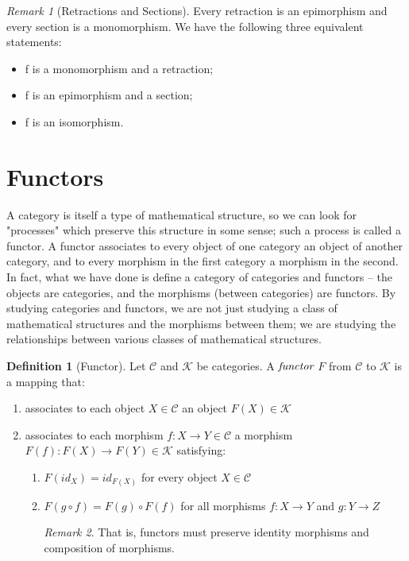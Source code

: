 \documentclass[10pt, oneside, reqno]{amsart}
\theoremstyle{plain}%
\theoremstyle{definition}
\newtheorem{defn}[thm]{Definition}
\theoremstyle{remark}
\newtheorem*{rem}{Remark}
\begin{document}
\begin{rem}[Retractions and Sections]
Every retraction is an epimorphism and every section is a monomorphism.
We have the following three equivalent statements:
\begin{itemize}
\item f is a monomorphism and a retraction;
\item f is an epimorphism and a section;
\item f is an isomorphism.
\end{itemize}
\end{rem}

\section{Functors} %
\label{sec:functors}
A category is itself a type of mathematical structure, so we can look for "processes" which preserve this structure in some sense; such a process is called a functor.
A functor associates to every object of one category an object of another category, and to every morphism in the first category a morphism in the second.
In fact, what we have done is define a category of categories and functors – the objects are categories, and the morphisms (between categories) are functors.
By studying categories and functors, we are not just studying a class of mathematical structures and the morphisms between them;
we are studying the relationships between various classes of mathematical structures.

\begin{defn}[Functor]
	Let $\mathcal{C}$ and $\mathcal{K}$ be categories. A $\emph{functor}$ $F$ from $\mathcal{C}$ to $\mathcal{K}$ is a mapping that:
	\begin{enumerate}
		\item associates to each object $X \in \mathcal{C}$ an object $F(X) \in  \mathcal{K}$
		
		\item associates to each morphism $f : X \to Y \in \mathcal{C}$ a morphism $F(f) : F(X) \to F(Y) \in \mathcal{K}$
		satisfying:
		\begin{enumerate}
			\item $F(id_{X}) = id_{F(X)}$ for every object $X \in \mathcal{C}$
			
			\item $F(g \circ f) = F(g) \circ F(f)$ for all morphisms $f : X \to Y$ and $g : Y \to Z$
			\begin{rem}
				That is, functors must preserve identity morphisms and composition of morphisms.
			\end{rem}
		\end{enumerate}
	\end{enumerate}
\end{defn}
\end{document}

